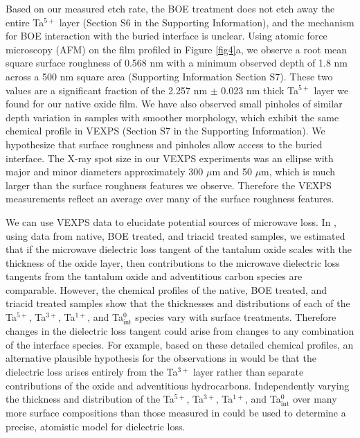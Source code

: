 \documentclass{WileyMSP-template}
\begin{document}
Based on our measured etch rate, the BOE treatment does not etch away the entire Ta$^{5+}$ layer (Section S6 in the Supporting Information), and the mechanism for BOE interaction with the buried interface is unclear. Using atomic force microscopy (AFM) on the film profiled in Figure \ref{fig4}a, we observe a root mean square surface roughness of 0.568 nm with a minimum observed depth of 1.8 nm across a 500 nm square area (Supporting Information Section S7). These two values are a significant fraction of the 2.257 nm $\pm$ 0.023 nm thick Ta$^{5+}$ layer we found for our native oxide film. We have also observed small pinholes of similar depth variation in samples with smoother morphology, which exhibit the same chemical profile in VEXPS (Section S7 in the Supporting Information). We hypothesize that surface roughness and pinholes allow access to the buried interface. The X-ray spot size in our VEXPS experiments was an ellipse with major and minor diameters approximately 300 $\mu$m and 50 $\mu$m, which is much larger than the surface roughness features we observe. Therefore the VEXPS measurements reflect an average over many of the surface roughness features.

We can use VEXPS data to elucidate potential sources of microwave loss. In \cite{kevin_resonator}, using data from native, BOE treated, and triacid treated samples, we estimated that if the microwave dielectric loss tangent of the tantalum oxide scales with the thickness of the oxide layer, then contributions to the microwave dielectric loss tangents from the tantalum oxide and adventitious carbon species are comparable. However, the chemical profiles of the native, BOE treated, and triacid treated samples show that the thicknesses and distributions of each of the Ta$^{5+}$, Ta$^{3+}$, Ta$^{1+}$, and Ta$^{0}_\text{int}$ species vary with surface treatments. Therefore changes in the dielectric loss tangent could arise from changes to any combination of the interface species. For example, based on these detailed chemical profiles, an alternative plausible hypothesis for the observations in \cite{kevin_resonator} would be that the dielectric loss arises entirely from the Ta$^{3+}$ layer rather than separate contributions of the oxide and adventitious hydrocarbons. Independently varying the thickness and distribution of the Ta$^{5+}$, Ta$^{3+}$, Ta$^{1+}$, and Ta$^{0}_\text{int}$ over many more surface compositions than those measured in \cite{kevin_resonator} could be used to determine a precise, atomistic model for dielectric loss.
\end{document}
